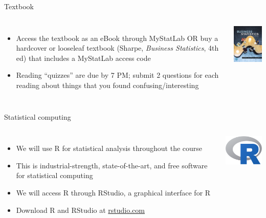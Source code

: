 \documentclass{beamer}\usepackage[]{graphicx}\usepackage[]{color}
\begin{document}
\begin{darkframes}
    \begin{frame}{Textbook}
      \begin{columns}[onlytextwidth]
        \begin{itemize}
          \item Access the textbook as an eBook through MyStatLab OR buy a hardcover or looseleaf textbook (Sharpe, \emph{Business Statistics}, 4th ed) that includes a MyStatLab access code
          \item Reading ``quizzes'' are due by 7 PM; submit 2 questions for each reading about things that you found confusing/interesting
        \end{itemize}
          \includegraphics[width=1.5in]{textbook}
      \end{columns}
    \end{frame}

    \begin{frame}{Statistical computing}
      \begin{columns}[onlytextwidth]
          \begin{itemize}
            \item We will use \alert{R} for statistical analysis throughout the course
            \item This is industrial-strength, state-of-the-art, and free software for statistical computing
            \item We will access R through \alert{RStudio}, a graphical interface for R
            \item Download R and RStudio at \url{rstudio.com}
          \end{itemize}
          \includegraphics[width=1in]{R}
      \end{columns}
    \end{frame}


\end{darkframes}
\end{document}

